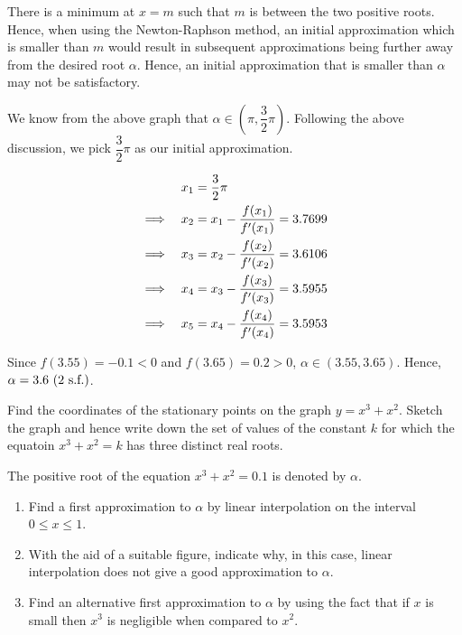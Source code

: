 \documentclass{echw}
\begin{document}

        There is a minimum at $x=m$ such that $m$ is between the two positive roots. Hence, when using the Newton-Raphson method, an initial approximation which is smaller than $m$ would result in subsequent approximations being further away from the desired root $\alpha$. Hence, an initial approximation that is smaller than $\alpha$ may not be satisfactory.

        We know from the above graph that $\alpha \in (\pi, \dfrac32 \pi)$. Following the above discussion, we pick $\dfrac32 \pi$ as our initial approximation.

        \begin{alignat*}{2}
            && x_1 &= \dfrac32 \pi \\
            \implies&&x_2 &= x_1 - \dfrac{f(x_1)}{f^\prime(x_1)} = 3.7699\\
            \implies&&x_3 &= x_2 - \dfrac{f(x_2)}{f^\prime(x_2)} = 3.6106\\
            \implies&&x_4 &= x_3 - \dfrac{f(x_3)}{f^\prime(x_3)} = 3.5955\\
            \implies&&x_5 &= x_4 - \dfrac{f(x_4)}{f^\prime(x_4)} = 3.5953
        \end{alignat*}

        Since $f(3.55) = -0.1 < 0$ and $f(3.65) = 0.2 > 0$, $\alpha \in (3.55, 3.65)$. Hence, $\alpha = 3.6 \text{ (2 s.f.)}$.


    \problem{}
        Find the coordinates of the stationary points on the graph $y = x^3 + x^2$. Sketch the graph and hence write down the set of values of the constant $k$ for which the equatoin $x^3 + x^2 = k$ has three distinct real roots.

        The positive root of the equation $x^3 + x^2 = 0.1$ is denoted by $\alpha$.

        \begin{enumerate}
            \item Find a first approximation to $\alpha$ by linear interpolation on the interval $0 \leq x \leq 1$.
            \item With the aid of a suitable figure, indicate why, in this case, linear interpolation does not give a good approximation to $\alpha$.
            \item Find an alternative first approximation to $\alpha$ by using the fact that if $x$ is small then $x^3$ is negligible when compared to $x^2$.
        \end{enumerate}
\end{document}
